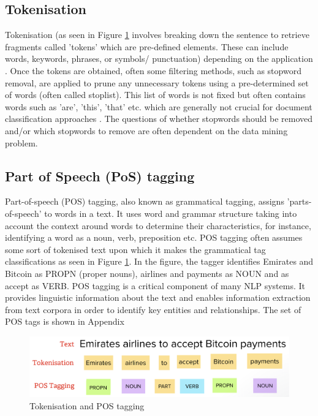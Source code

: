 \subsection{Tokenisation}
Tokenisation (as seen in Figure \ref{fig:tokenisation+pos} involves breaking down the sentence to retrieve fragments called 'tokens' which are pre-defined elements. These can include words, keywords, phrases, or symbols/ punctuation) depending on the application \cite{kannan2014preprocessing} \cite{ieee_named_entity}. Once the tokens are obtained, often some filtering methods, such as stopword removal, are applied to prune any unnecessary tokens using a pre-determined set of words (often called stoplist). This list of words is not fixed but often contains words such as 'are', 'this', 'that' etc. which are generally not crucial for document classification approaches \cite{kannan2014preprocessing}. The questions of whether stopwords should be removed and/or which stopwords to remove are often dependent on the data mining problem.  

\subsection{Part of Speech (PoS) tagging}

Part-of-speech (POS) tagging, also known as grammatical tagging, assigns 'parts-of-speech' to words in a text.  It uses word and grammar structure taking into account  the context around words to determine their characteristics, for instance, identifying a word as a noun, verb, preposition etc. \cite{pos} POS tagging often assumes some sort of tokenised text upon which it makes the grammatical tag classifications as seen in Figure \ref{fig:tokenisation+pos}. In the figure, the tagger identifies Emirates and Bitcoin as PROPN (proper nouns), airlines and payments as NOUN and as accept as VERB. POS tagging is a critical component of many NLP systems. It provides linguistic information about the text and enables information extraction from text corpora in order to identify key entities and relationships. 
The set of POS tags is shown in Appendix~

\begin{figure}[H]
\centering
\includegraphics[scale=0.35]{images/token+pos.png}
\caption{Tokenisation and POS tagging}
\label{fig:tokenisation+pos}
\end{figure}

